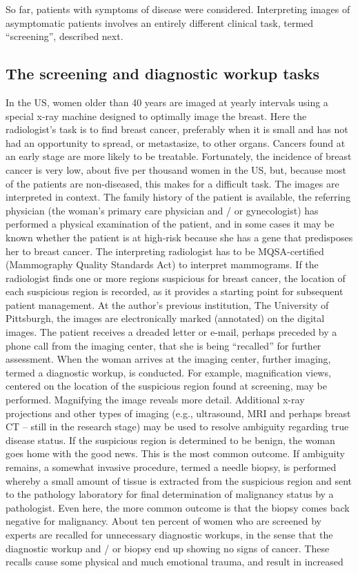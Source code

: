 \documentclass[
]{book}
\begin{document}
So far, patients with symptoms of disease were considered. Interpreting images of asymptomatic patients involves an entirely different clinical task, termed ``screening'', described next.

\hypertarget{the-screening-and-diagnostic-workup-tasks}{%
\subsection{The screening and diagnostic workup tasks}\label{the-screening-and-diagnostic-workup-tasks}}

In the US, women older than 40 years are imaged at yearly intervals using a special x-ray machine designed to optimally image the breast. Here the radiologist's task is to find breast cancer, preferably when it is small and has not had an opportunity to spread, or metastasize, to other organs. Cancers found at an early stage are more likely to be treatable. Fortunately, the incidence of breast cancer is very low, about five per thousand women in the US, but, because most of the patients are non-diseased, this makes for a difficult task. The images are interpreted in context. The family history of the patient is available, the referring physician (the woman's primary care physician and / or gynecologist) has performed a physical examination of the patient, and in some cases it may be known whether the patient is at high-risk because she has a gene that predisposes her to breast cancer. The interpreting radiologist has to be MQSA-certified (Mammography Quality Standards Act) to interpret mammograms. If the radiologist finds one or more regions suspicious for breast cancer, the location of each suspicious region is recorded, as it provides a starting point for subsequent patient management. At the author's previous institution, The University of Pittsburgh, the images are electronically marked (annotated) on the digital images. The patient receives a dreaded letter or e-mail, perhaps preceded by a phone call from the imaging center, that she is being ``recalled'' for further assessment. When the woman arrives at the imaging center, further imaging, termed a diagnostic workup, is conducted. For example, magnification views, centered on the location of the suspicious region found at screening, may be performed. Magnifying the image reveals more detail. Additional x-ray projections and other types of imaging (e.g., ultrasound, MRI and perhaps breast CT -- still in the research stage) may be used to resolve ambiguity regarding true disease status. If the suspicious region is determined to be benign, the woman goes home with the good news. This is the most common outcome. If ambiguity remains, a somewhat invasive procedure, termed a needle biopsy, is performed whereby a small amount of tissue is extracted from the suspicious region and sent to the pathology laboratory for final determination of malignancy status by a pathologist. Even here, the more common outcome is that the biopsy comes back negative for malignancy. About ten percent of women who are screened by experts are recalled for unnecessary diagnostic workups, in the sense that the diagnostic workup and / or biopsy end up showing no signs of cancer. These recalls cause some physical and much emotional trauma, and result in increased 
\end{document}
